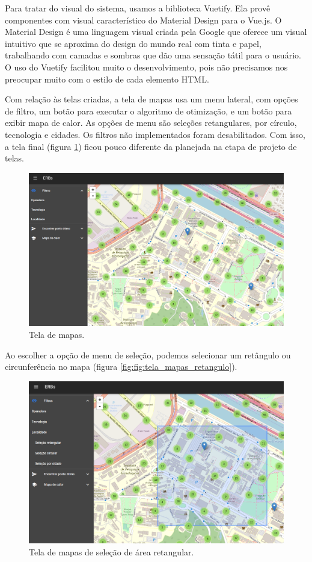 \documentclass[]{politex}
\begin{document}
Para tratar do visual do sistema, usamos a biblioteca Vuetify. Ela provê componentes
com visual característico do Material Design para o Vue.js. O Material Design é
uma linguagem visual criada pela Google que oferece um visual intuitivo que
se aproxima do design do mundo real com tinta e papel, trabalhando com camadas
e sombras que dão uma sensação tátil para o usuário. O uso do Vuetify facilitou
muito o desenvolvimento, pois não precisamos nos preocupar muito com o estilo de
cada elemento HTML.

Com relação às telas criadas, a tela de mapas usa um menu lateral, com opções de
filtro, um botão para executar o algoritmo de otimização, e um botão para exibir mapa de
calor. As opções de menu são seleções retangulares, por círculo, tecnologia e
cidades. Os filtros não implementados foram desabilitados.
Com isso, a tela final (figura \ref{fig:tela_mapas}) ficou pouco diferente da planejada na etapa de projeto de
telas.

\begin{figure}[H]
    \centering
    \includegraphics[width=6in]{imagens/tela-mapas}
    \caption{Tela de mapas.}
    \label{fig:tela_mapas}
\end{figure}

Ao escolher a opção de menu de seleção, podemos selecionar um retângulo ou
circunferência no mapa (figura \ref{fig:fig:tela_mapas_retangulo}).

\begin{figure}[H]
    \centering
    \includegraphics[width=6in]{imagens/tela-mapas-retangulo}
    \caption{Tela de mapas de seleção de área retangular.}
    \label{fig:tela_mapas_retangulo}
\end{figure}
\end{document}
